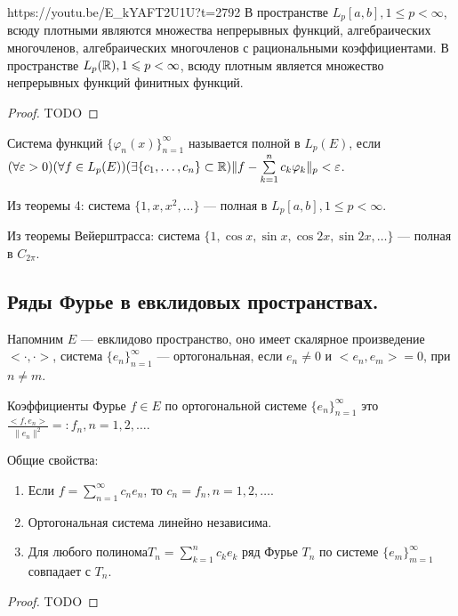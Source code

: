 \begin{linkthm}{https://youtu.be/E_kYAFT2U1U?t=2792}
	В пространстве $L_p[a,b], 1\leqslant p<\infty$, всюду плотными являются множества непрерывных функций, алгебраических многочленов, алгебраических многочленов с рациональными коэффициентами. В пространстве $L_p(\mathbb{R}), 1\leqslant p<\infty$, всюду плотным является множество непрерывных функций финитных функций.
\end{linkthm}

\begin{proof}
	TODO
\end{proof}

\begin{Def}
	Система функций $\{\varphi_n(x)\}_{n=1}^\infty$ называется полной в $L_p(E)$, если \\$(\forall\varepsilon>0)(\forall f\in L_p(E))(\exists \{c_1,\ldots,c_n\}\subset\mathbb{R})\|f-\sum\limits_{k=1}^n c_k\varphi_k\|_p<\varepsilon$.
\end{Def}

\begin{corollary}
	 Из теоремы 4: система $\{1,x,x^2,\ldots\}$ --- полная в $L_p[a,b], 1\leqslant p<\infty$.
\end{corollary}
 
\begin{corollary}
	Из теоремы Вейерштрасса: система $\{1,\cos x,\sin x, \cos 2x, \sin 2x,\ldots\}$ --- полная в $C_{2\pi}$.
\end{corollary}

\subsection{Ряды Фурье в евклидовых пространствах.}
Напомним $E$ --- евклидово пространство, оно имеет скалярное произведение $<\cdot,\cdot>$, система $\{e_n\}_{n=1}^\infty$ --- ортогональная, если $e_n\ne 0$ и $<e_n,e_m>=0$, при $n\ne m$.

Коэффициенты Фурье $f\in E$ по ортогональной системе $\{e_n\}_{n=1}^\infty$ это $\frac{<f,e_n>}{\|e_n\|^2}=:f_n, n=1,2,\ldots$.

Общие свойства:
\begin{enumerate}
	\item Если $f=\sum\limits_{n=1}^\infty c_n e_n$, то $c_n=f_n,n=1,2,\ldots$.
	\item Ортогональная система линейно независима.
	\item Для любого полинома$T_n=\sum\limits_{k=1}^n c_ke_k$ ряд Фурье $T_n$ по системе $\{e_m\}_{m=1}^\infty$ совпадает с $T_n$.
\end{enumerate}
\begin{proof}
TODO
\end{proof}


























